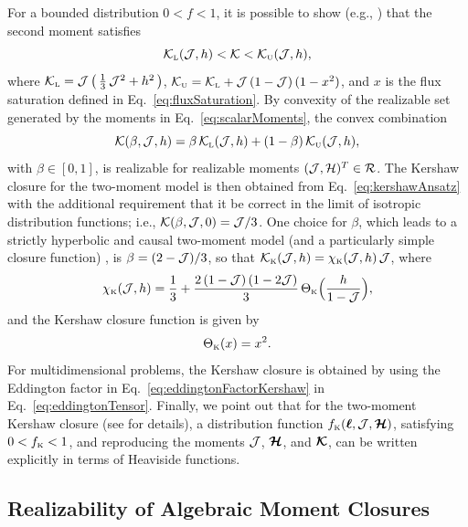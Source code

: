 For a bounded distribution $0<f<1$, it is possible to show (e.g., \cite{banachLarecki_2013}) that the second moment satisfies
\begin{equation}
  \mathcal{K}_{\mbox{\tiny L}}(\mathcal{J},h) < \mathcal{K} < \mathcal{K}_{\mbox{\tiny U}}(\mathcal{J},h),
\end{equation}
where $\mathcal{K}_{\mbox{\tiny L}}=\mathcal{J}\,\big(\,\frac{1}{3}\,\mathcal{J}^{2}+h^{2}\,\big)$, $\mathcal{K}_{\mbox{\tiny U}}=\mathcal{K}_{\mbox{\tiny L}} + \mathcal{J}\,(1-\mathcal{J})\,(1-x^{2})$, and $x$ is the flux saturation defined in Eq.~\eqref{eq:fluxSaturation}.  
By convexity of the realizable set generated by the moments in Eq.~\eqref{eq:scalarMoments}, the convex combination
\begin{equation}
  \mathcal{K}(\beta,\mathcal{J},h)=\beta\,\mathcal{K}_{\mbox{\tiny L}}(\mathcal{J},h)+(1-\beta)\,\mathcal{K}_{\mbox{\tiny U}}(\mathcal{J},h),
  \label{eq:kershawAnsatz}
\end{equation}
with $\beta\in[0,1]$, is realizable for realizable moments $(\mathcal{J},\mathcal{H})^{T}\in\mathcal{R}$.  
The Kershaw closure for the two-moment model is then obtained from Eq.~\eqref{eq:kershawAnsatz} with the additional requirement that it be correct in the limit of isotropic distribution functions; i.e., $\mathcal{K}(\beta,\mathcal{J},0)=\mathcal{J}/3$.  
One choice for $\beta$, which leads to a strictly hyperbolic and causal two-moment model (and a particularly simple closure function) \cite{banachLarecki_2017a}, is $\beta=(2-\mathcal{J})/3$, so that $\mathcal{K}_{\mbox{\tiny K}}(\mathcal{J},h)=\chi_{\mbox{\tiny K}}(\mathcal{J},h)\,\mathcal{J}$, where
\begin{equation}
  \chi_{\mbox{\tiny K}}(\mathcal{J},h)=\frac{1}{3}+\frac{2\,(1-\mathcal{J})\,(1-2\mathcal{J})}{3}\,\Theta_{\mbox{\tiny K}}\Big(\frac{h}{1-\mathcal{J}}\Big),
  \label{eq:eddingtonFactorKershaw}
\end{equation}
and the Kershaw closure function is given by
\begin{equation}
  \Theta_{\mbox{\tiny K}}(x)=x^{2}.  
\end{equation}
For multidimensional problems, the Kershaw closure is obtained by using the Eddington factor in Eq.~\eqref{eq:eddingtonFactorKershaw} in Eq.~\eqref{eq:eddingtonTensor}.  
Finally, we point out that for the two-moment Kershaw closure (see \cite{banachLarecki_2017a} for details), a distribution function $f_{\mbox{\tiny K}}(\boldsymbol{\ell},\mathcal{J},\boldsymbol{\mathcal{H}})$, satisfying $0 < f_{\mbox{\tiny K}} < 1$, and reproducing the moments $\mathcal{J}$, $\boldsymbol{\mathcal{H}}$, and $\boldsymbol{\mathcal{K}}$, can be written explicitly in terms of Heaviside functions.  

\subsection{Realizability of Algebraic Moment Closures}

